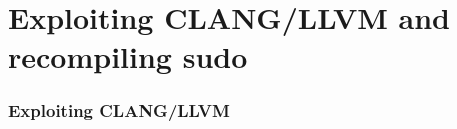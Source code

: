 \section{Exploiting CLANG/LLVM and recompiling sudo}

\begin{frame}
  \frametitle{Exploiting CLANG/LLVM}

\end{frame}

